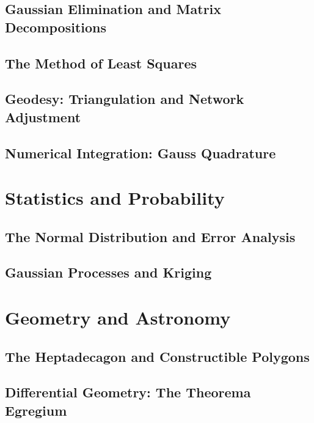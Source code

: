 \documentclass[12pt,oneside]{book}
\begin{document}
\chapter{Gaussian Elimination and Matrix Decompositions}
\label{ch:gaussian-elim}


\chapter{The Method of Least Squares}
\label{ch:least-squares}


\chapter{Geodesy: Triangulation and Network Adjustment}
\label{ch:geodesy}


\chapter{Numerical Integration: Gauss Quadrature}
\label{ch:gauss-quadrature}


\part{Statistics and Probability}

\chapter{The Normal Distribution and Error Analysis}
\label{ch:normal}


\chapter{Gaussian Processes and Kriging}
\label{ch:gp}


\part{Geometry and Astronomy}

\chapter{The Heptadecagon and Constructible Polygons}
\label{ch:heptadecagon}


\chapter{Differential Geometry: The Theorema Egregium}
\label{ch:theorema}

\end{document}

